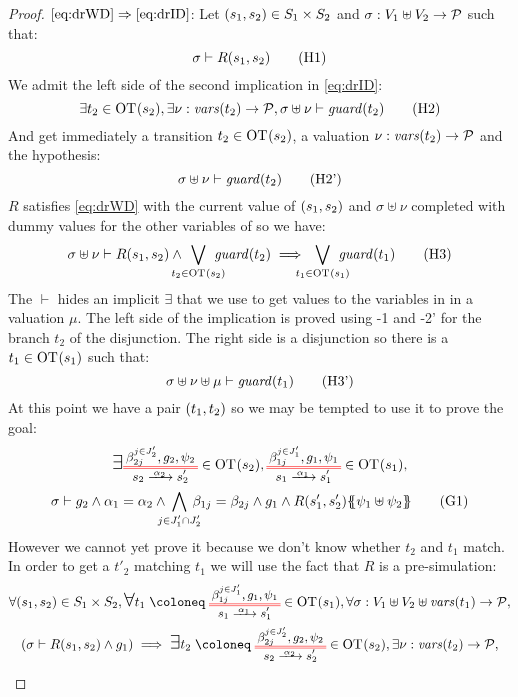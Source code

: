 \documentclass{article}
\begin{document}
\begin{proof}
\item[\(\eqref{eq:drWD}\Rightarrow\eqref{eq:drID}\):]
	Let \({\left(s_1, s_2\right)} \in S_1 \times S_2\) and \(\sigma: V_1 \uplus V_2 \to \mathcal{P}\) such that:
	\[ \sigma \vdash R\mpar{s_1, s_2} \hyp{1} \]
	We admit the left side of the second implication in \eqref{eq:drID}:
	\[ \exists t_2 \in \fOT{s_2}, \exists \nu: \fvars{t_2} \to \values, \sigma \uplus \nu \vdash \fguard{t_2} \hyp{2} \]
	And get immediately a transition \(t_2 \in \mathrm{OT}_{}{\left(s_2\right)}\), a valuation \(\nu: \mathit{vars}{\left(t_2\right)} \to \mathcal{P}\) and the hypothesis:
	\[ \sigma \uplus \nu \vdash \fguard{t_2} \hyp{2'} \]
	\(R\) satisfies \eqref{eq:drWD} with the current value of \({\left(s_1, s_2\right)}\) and \(\sigma \uplus \nu\) completed with dummy values for the other variables of  so we have:
	\[ \sigma \uplus \nu \vdash R\mpar{s_1, s_2} \wedge \bigvee_\subbox{t_2 \in \fOT{s_2}} \fguard{t_2} \implies \bigvee_\subbox{t_1 \in \fOT{s_1}} \fguard{t_1} \hyp{3} \]
	The \(\vdash\) hides an implicit \(\exists\) that we use to get values to the variables in  in a valuation \(\mu\).
	The left side of the implication is proved using \hyp{1} and \hyp{2'} for the branch \(t_2\) of the disjunction.
	The right side is a disjunction so there is a \(t_1 \in \mathrm{OT}_{}{\left(s_1\right)}\) such that:
	\[ \sigma \uplus \nu \uplus \mu \vdash \fguard{t_1} \hyp{3'} \]
	At this point we have a pair \({\left(t_1, t_2\right)}\) so we may be tempted to use it to prove the goal:
	\begin{multline}
		\bigsymb{\exists} \OTx{2}{}{2}{2} \in \fOT{s_2}, \OTx{1}{}{1}{1} \in \fOT{s_1}, \\
		\sigma \vdash g_2 \wedge \alpha_1 = \alpha_2 \wedge \bigwedge_\subbox{j \in J'_1 \cap J'_2} \beta_{1j} = \beta_{2j} \wedge g_1 \wedge R\mpar{s'_1, s'_2}\psubst{\psi_1 \uplus \psi_2} \goal{1}
	\end{multline}
	However we cannot yet prove it because we don't know whether \(t_2\) and \(t_1\) match.
	In order to get a \(t'_2\) matching \(t_1\) we will use the fact that \(R\) is a pre-simulation:
	\begin{multline}
		\forall \mpar{s_1, s_2} \in S_1 \times S_2, \bigsymb{\forall} t_1 \defobject \OTx{1}{}{1}{1} \in \fOT{s_1}, \forall \sigma: V_1 \uplus V_2 \uplus \fvars{t_1} \to \values, \\
		\mpar{\sigma \vdash R\mpar{s_1, s_2} \wedge g_1} \implies \bigsymb{\exists} t_2 \defobject \OTx{2}{}{2}{2} \in \fOT{s_2}, \exists \nu: \fvars{t_2} \to \values, \\

\end{multline}
\end{proof}
\end{document}
